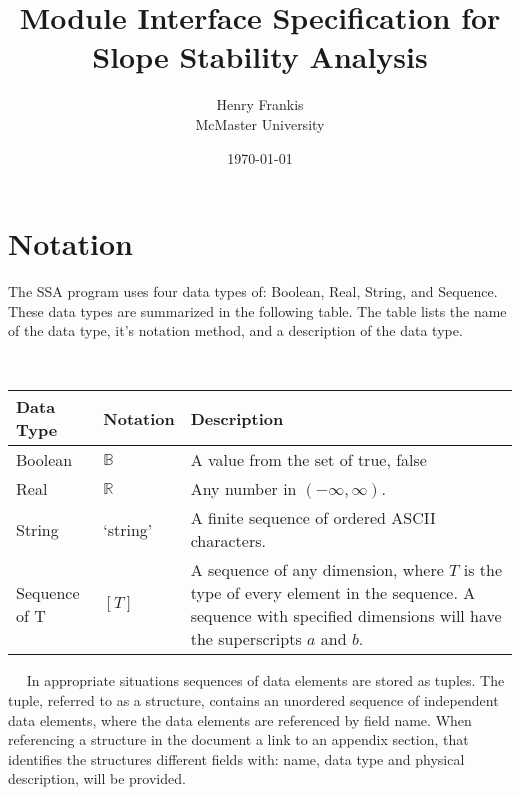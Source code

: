 \documentclass[12pt]{article}
\begin{document}
\title{Module Interface Specification for Slope Stability Analysis} 
\author{Henry Frankis\\McMaster University}
\date{\today}
	
\maketitle
\tableofcontents


\section{Notation}

The SSA program uses four data types of: Boolean, Real, String, and
Sequence. These data types are summarized in the following table. The
table lists the name of the data type, it's notation method, and a
description of the data type.

~\newline \renewcommand*{\arraystretch}{1.5}
\begin{tabular}{p{} p{} p{}}
  \hline \textbf{Data Type} & \textbf{Notation} & \textbf{Description}
  \\ \hline

  Boolean & $\mathbb{B}$ & A value from the set of {true, false}\\
  
  Real & $\mathbb{R}$ & Any number in $\left( -\infty, \infty
  \right)$.\\

  String & `string' & A finite sequence of ordered ASCII
  characters.\\

  Sequence of T & $[T]$ & A sequence of any dimension, where $T$ is
  the type of every element in the sequence. A sequence with specified
  dimensions will have the superscripts $a$ and $b$.\\ \hline
\end{tabular}

~\newline~\newline\noindent
In appropriate situations sequences of data elements are stored as
tuples. The tuple, referred to as a structure, contains an unordered
sequence of independent data elements, where the data elements are
referenced by field name. When referencing a structure in the document
a link to an appendix section, that identifies the structures different
fields with: name, data type and physical description, will be
provided.
\end{document}
